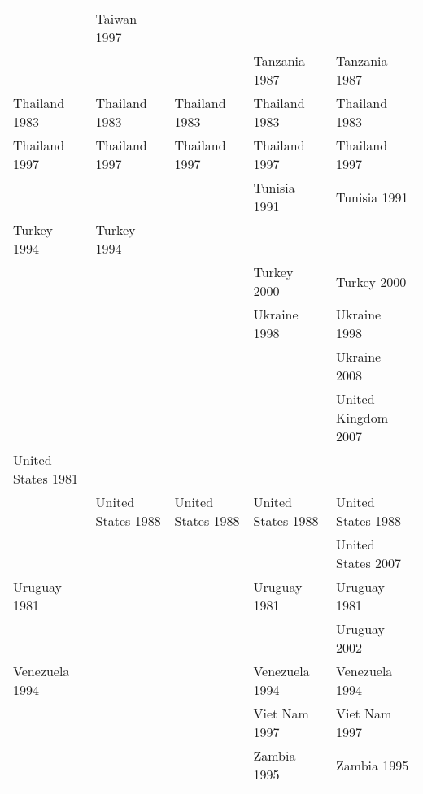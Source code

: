 \begin{table}[ht]
{\begin{tabular}{lllll}
   & Taiwan 1997\cellcolor[gray]{0.75} &  &  &  \\ 
   &  &  & Tanzania 1987\cellcolor[gray]{1} & Tanzania 1987\cellcolor[gray]{1} \\ 
  Thailand 1983\cellcolor[gray]{0.5} & Thailand 1983\cellcolor[gray]{0.5} & Thailand 1983\cellcolor[gray]{0.5} & Thailand 1983\cellcolor[gray]{0.5} & Thailand 1983\cellcolor[gray]{0.5} \\ 
  Thailand 1997\cellcolor[gray]{0.5} & Thailand 1997\cellcolor[gray]{0.5} & Thailand 1997\cellcolor[gray]{0.5} & Thailand 1997\cellcolor[gray]{0.5} & Thailand 1997\cellcolor[gray]{0.5} \\ 
   &  &  & Tunisia 1991\cellcolor[gray]{1} & Tunisia 1991\cellcolor[gray]{1} \\ 
  Turkey 1994\cellcolor[gray]{0.5} & Turkey 1994\cellcolor[gray]{0.5} &  &  &  \\ 
   &  &  & Turkey 2000\cellcolor[gray]{0.5} & Turkey 2000\cellcolor[gray]{0.5} \\ 
   &  &  & Ukraine 1998\cellcolor[gray]{0.5} & Ukraine 1998\cellcolor[gray]{0.5} \\ 
   &  &  &  & Ukraine 2008\cellcolor[gray]{0.5} \\ 
   &  &  &  & United Kingdom 2007\cellcolor[gray]{0.5} \\ 
  United States 1981\cellcolor[gray]{0.5} &  &  &  &  \\ 
   & United States 1988\cellcolor[gray]{0.5} & United States 1988\cellcolor[gray]{0.5} & United States 1988\cellcolor[gray]{0.5} & United States 1988\cellcolor[gray]{0.5} \\ 
   &  &  &  & United States 2007\cellcolor[gray]{0.5} \\ 
  Uruguay 1981\cellcolor[gray]{1} &  &  & Uruguay 1981\cellcolor[gray]{1} & Uruguay 1981\cellcolor[gray]{1} \\ 
   &  &  &  & Uruguay 2002\cellcolor[gray]{0.5} \\ 
  Venezuela 1994\cellcolor[gray]{0.5} &  &  & Venezuela 1994\cellcolor[gray]{0.5} & Venezuela 1994\cellcolor[gray]{0.5} \\ 
   &  &  & Viet Nam 1997\cellcolor[gray]{1} & Viet Nam 1997\cellcolor[gray]{1} \\ 
   &  &  & Zambia 1995\cellcolor[gray]{0.5} & Zambia 1995\cellcolor[gray]{0.5} \\ 
   \hline
\end{tabular}
}
\end{table}
